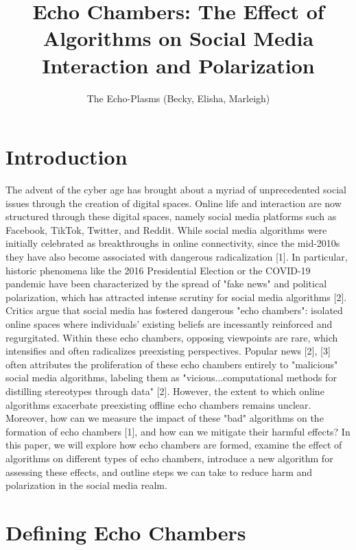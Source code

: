 \documentclass[10pt]{article}
\author{The Echo-Plasms (Becky, Elisha, Marleigh)}
\title{Echo Chambers: The Effect of Algorithms on Social Media Interaction and Polarization}
\begin{document}
  \maketitle

\section{Introduction}
      
\indent    

The advent of the cyber age has brought about a myriad of unprecedented social issues through the creation of digital spaces. Online life and interaction are now structured through these digital spaces, namely social media platforms such as Facebook, TikTok, Twitter, and Reddit. While social media algorithms were initially celebrated as breakthroughs in online connectivity, since the mid-2010s they have also become associated with dangerous radicalization [1]. In particular, historic phenomena like the 2016 Presidential Election or the COVID-19 pandemic have been characterized by the spread of "fake news" and political polarization, which has attracted intense scrutiny for social media algorithms [2]. Critics argue that social media has fostered dangerous "echo chambers": isolated online spaces where individuals' existing beliefs are incessantly reinforced and regurgitated. Within these echo chambers, opposing viewpoints are rare, which intensifies and often radicalizes preexisting perspectives. Popular news [2], [3] often attributes the proliferation of these echo chambers entirely to "malicious" social media algorithms, labeling them as "vicious...computational methods for distilling stereotypes through data" [2]. However, the extent to which online algorithms exacerbate preexisting offline echo chambers remains unclear. Moreover, how can we measure the impact of these "bad" algorithms on the formation of echo chambers [1], and how can we mitigate their harmful effects? In this paper, we will explore how echo chambers are formed, examine the effect of algorithms on different types of echo chambers, introduce a new algorithm for assessing these effects, and outline steps we can take to reduce harm and polarization in the social media realm. 


  \section{Defining Echo Chambers }

\indent 
\end{document}
